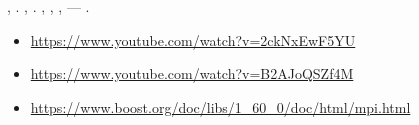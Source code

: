 \documentclass[a4paper]{article}
\newcommand\liststyleLvii{%
\renewcommand\labelitemi{{\textbullet}}
\renewcommand\labelitemii{${\circ}$}
\renewcommand\labelitemiii{${\blacksquare}$}
\renewcommand\labelitemiv{{\textbullet}}
}
\begin{document}
{
{\CYRV} {\cyrd}{\cyra}{\cyrn}{\cyrn}{\cyro}{\cyrishrt} {\cyrr}{\cyra}{\cyrb}{\cyro}{\cyrt}{\cyre} {\cyrm}{\cyrery}
{\cyrr}{\cyra}{\cyrs}{\cyrs}{\cyrm}{\cyro}{\cyrt}{\cyrr}{\cyre}{\cyrl}{\cyri}
{\cyra}{\cyrl}{\cyrg}{\cyro}{\cyrr}{\cyri}{\cyrt}{\cyrm}{\cyrery} {\cyrd}{\cyrl}{\cyrya}
{\cyrv}{\cyrery}{\cyrd}{\cyre}{\cyrl}{\cyre}{\cyrn}{\cyri}{\cyre}
{\cyrk}{\cyro}{\cyrm}{\cyrp}{\cyro}{\cyrn}{\cyre}{\cyrn}{\cyrt} {\cyrn}{\cyra}
{\cyrb}{\cyri}{\cyrn}{\cyra}{\cyrr}{\cyrn}{\cyro}{\cyrm}
{\cyri}{\cyrz}{\cyro}{\cyrb}{\cyrr}{\cyra}{\cyrzh}{\cyre}{\cyrn}{\cyri}{\cyri}, {\cyra}
{\cyrt}{\cyra}{\cyrk}{\cyrzh}{\cyre} {\cyrv}{\cyrery}{\cyrd}{\cyre}{\cyrl}{\cyre}{\cyrn}{\cyri}{\cyrya} {\cyri}{\cyrh}
{\cyrv}{\cyrery}{\cyrp}{\cyru}{\cyrk}{\cyrl}{\cyrery}{\cyrh} {\cyro}{\cyrb}{\cyro}{\cyrl}{\cyro}{\cyrch}{\cyre}{\cyrk}.
{\CYRM}{\cyrery} {\cyrr}{\cyra}{\cyrs}{\cyrs}{\cyrm}{\cyro}{\cyrt}{\cyrr}{\cyre}{\cyrl}{\cyri}
{\cyrr}{\cyre}{\cyra}{\cyrl}{\cyri}{\cyrz}{\cyra}{\cyrc}{\cyri}{\cyryu}
{\cyra}{\cyrl}{\cyrg}{\cyro}{\cyrr}{\cyri}{\cyrt}{\cyrm}{\cyro}{\cyrv},
{\cyrp}{\cyra}{\cyrr}{\cyra}{\cyrl}{\cyri}{\cyrz}{\cyra}{\cyrc}{\cyri}{\cyryu} {\cyri}
{\cyrr}{\cyre}{\cyrz}{\cyru}{\cyrl}{\cyrsftsn}{\cyrt}{\cyra}{\cyrt}{\cyrery}
{\cyrp}{\cyra}{\cyrr}{\cyra}{\cyrl}{\cyrl}{\cyre}{\cyrl}{\cyri}{\cyrz}{\cyra}{\cyrc}{\cyri}{\cyri}. {\CYRP}{\cyro}
{\cyrr}{\cyre}{\cyrz}{\cyru}{\cyrl}{\cyrsftsn}{\cyrt}{\cyra}{\cyrt}{\cyra}{\cyrm}, {\cyrm}{\cyro}{\cyrzh}{\cyrn}{\cyro}
{\cyrs}{\cyrk}{\cyra}{\cyrz}{\cyra}{\cyrt}{\cyrsftsn}, {\cyrch}{\cyrt}{\cyro}
{\cyrp}{\cyra}{\cyrr}{\cyra}{\cyrl}{\cyrl}{\cyre}{\cyrl}{\cyri}{\cyrz}{\cyra}{\cyrc}{\cyri}{\cyrya}
{\cyrd}{\cyra}{\cyrn}{\cyrn}{\cyro}{\cyrishrt} {\cyrz}{\cyra}{\cyrd}{\cyra}{\cyrch}{\cyri}
{\cyri}{\cyrm}{\cyre}{\cyre}{\cyrt}
{\cyrp}{\cyrr}{\cyra}{\cyrk}{\cyrt}{\cyri}{\cyrch}{\cyre}{\cyrs}{\cyrk}{\cyri}{\cyrishrt}
{\cyrs}{\cyrm}{\cyrery}{\cyrs}{\cyrl}, {\cyru}{\cyrv}{\cyre}{\cyrl}{\cyri}{\cyrch}{\cyre}{\cyrn}{\cyri}{\cyre}
{\cyrs}{\cyrk}{\cyro}{\cyrr}{\cyro}{\cyrs}{\cyrt}{\cyri} {\cyrr}{\cyra}{\cyrb}{\cyro}{\cyrt}{\cyrery}
{\cyra}{\cyrl}{\cyrg}{\cyro}{\cyrr}{\cyri}{\cyrt}{\cyrm}{\cyra} ---
{\cyrp}{\cyrr}{\cyri}{\cyrs}{\cyru}{\cyrt}{\cyrs}{\cyrt}{\cyrv}{\cyru}{\cyre}{\cyrt}.}
\newpage
{\centering{}\bfseries
\hypertarget{RefHeadingToc806714454204}{}{\CYRL}{\cyri}{\cyrt}{\cyre}{\cyrr}{\cyra}{\cyrt}{\cyru}{\cyrr}{\cyra}
\par}

\liststyleLvii
\begin{itemize}
\item {
\url{https://www.youtube.com/watch?v=2ckNxEwF5YU}}
\item {
\url{https://www.youtube.com/watch?v=B2AJoQSZf4M}}
\item {
\url{https://www.boost.org/doc/libs/1_60_0/doc/html/mpi.html}}
\end{itemize}
\newpage
{\centering{}\bfseries
\hypertarget{RefHeadingToc804714454204}{}{\CYRP}{\cyrr}{\cyri}{\cyrl}{\cyro}{\cyrzh}{\cyre}{\cyrn}{\cyri}{\cyre}
\par}
\end{document}
